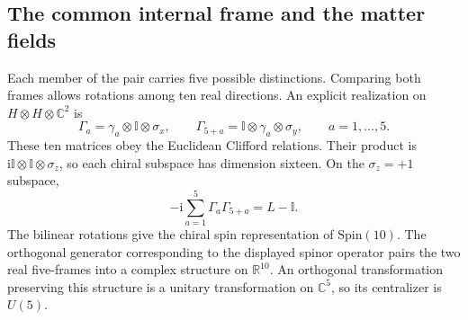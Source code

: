 \documentclass[aps,prx,onecolumn,10pt,notitlepage,nofootinbib,longbibliography]{revtex4-2}
\numberwithin{equation}{section}
\numberwithin{table}{section}
\newcommand{\Id}{\mathbb I}
\newcommand{\CC}{\mathbb C}
\newcommand{\RR}{\mathbb R}
\newcommand{\ii}{\mathrm i}
\begin{document}
\subsection{The common internal frame and the matter fields}
Each member of the pair carries five possible distinctions. Comparing both frames allows rotations among ten real directions. An explicit realization on $H\otimes H\otimes\CC^2$ is
\begin{equation}
 \Gamma_a=\gamma_a\otimes\Id\otimes\sigma_x,
 \qquad \Gamma_{5+a}=\Id\otimes\gamma_a\otimes\sigma_y,
 \qquad a=1,\ldots,5.
 \label{eq:tenclifford}
\end{equation}
These ten matrices obey the Euclidean Clifford relations. Their product is $\ii\Id\otimes\Id\otimes\sigma_z$, so each chiral subspace has dimension sixteen. On the $\sigma_z=+1$ subspace,
\begin{equation}
 -\ii\sum_{a=1}^5\Gamma_a\Gamma_{5+a}=L-\Id.
 \label{eq:paircomplexstructure}
\end{equation}
The bilinear rotations give the chiral spin representation of $\mathrm{Spin}(10)$. The orthogonal generator corresponding to the displayed spinor operator pairs the two real five-frames into a complex structure on $\RR^{10}$. An orthogonal transformation preserving this structure is a unitary transformation on $\CC^5$, so its centralizer is $U(5)$.
\end{document}
